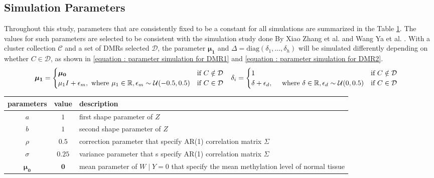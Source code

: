 \documentclass{report}
\begin{document}
\subsection{Simulation Parameters}

Throughout this study, parameters that are consistently fixed to be a constant for all simulations are summarized in the Table \ref{table : parameters fixed as constants}. The values for such parameters are selected to be consistent with the simulation study done By Xiao Zhang et al. and Wang Ya et al. \cite{zhang2018data,wang2017accounting}.
With a cluster collection $\mathcal{C}$ and a set of DMRs selected $\mathcal{D}$, the parameter $\boldsymbol{\mu_1}$ and
 $\Delta = \mathrm{diag}(\delta_1,\ldots,\delta_h)$ will be simulated differently depending on whether $C \in \mathcal{D}$, as shown in \eqref{equation : parameter simulation for DMR1} and \eqref{equation : parameter simulation for DMR2}.
\begin{subequations}
\begin{align}  \label{equation : parameter simulation for DMR1}
     \boldsymbol{\mu_1} &= \begin{cases}
         \boldsymbol{\mu_0} & \text{if } C \notin \mathcal{D}
         \\
         \mu_1 I + \epsilon_m, \text{ where } \mu_1 \in \RR, \epsilon_m \sim \mathcal{U}(-0.5,0.5) & \text{if } C \in \mathcal{D}
     \end{cases}
     \end{align}
\begin{align} \label{equation : parameter simulation for DMR2}
      \delta_i &= \begin{cases}
         1 & \text{if } C \notin \mathcal{D}
         \\
          \delta + \epsilon_d, \quad \text{ where }\delta \in \RR,\epsilon_d \sim \mathcal{U}(0,0.5) & \text{if } C \in \mathcal{D}
     \end{cases}
     \end{align}
\end{subequations}

\begin{table}[bh] \label{table : parameters fixed as constants}
    \begin{tabular}{c c l }
        \toprule
     parameters & value & description\\
     \midrule
        $a$ & $1$ & first shape parameter of $Z$ \\
        $b$ & $1$ & second shape parameter of $Z$ \\
        $\rho$ & $0.5$ & correction parameter that specify AR(1) correlation matrix $\Sigma$  \\
        $\sigma$ & $0.25$ & variance parameter that s specify AR(1) correlation matrix $\Sigma$ \\
        $\boldsymbol{\mu_0}$ & $\mathbf{0}$ & mean parameter of $W \mid Y=0$ that specify the mean methylation level of normal tissue \\
        \bottomrule
    \end{tabular} 
\end{table}
\end{document}
